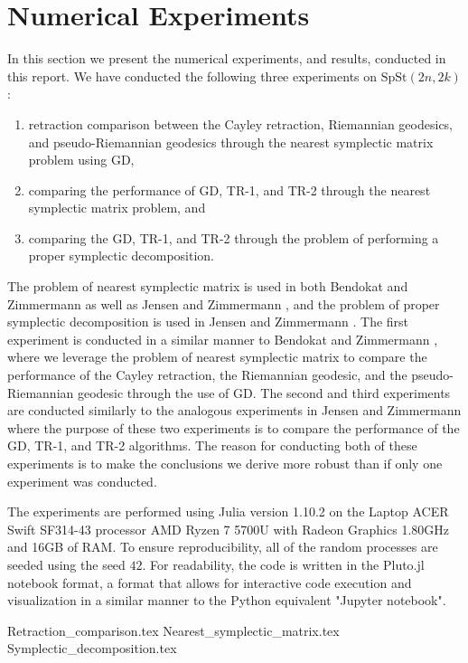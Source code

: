 \section{Numerical Experiments}\label{sec:Numerical_experiments}
In this section we present the numerical experiments, and results, conducted in this report. We have conducted the following three experiments on $\mathrm{SpSt}(2n, 2k)$: 
\begin{enumerate}
    \item retraction comparison between the Cayley retraction, Riemannian geodesics, and pseudo-Riemannian geodesics through the nearest symplectic matrix problem using GD, 
    \item comparing the performance of GD, TR-1, and TR-2 through the nearest symplectic matrix problem, and 
    \item comparing the GD, TR-1, and TR-2 through the problem of performing a proper symplectic decomposition.
\end{enumerate}
The problem of nearest symplectic matrix is used in both Bendokat and Zimmermann \cite[p.~25]{BendokatZimmermann2021} as well as Jensen and Zimmermann \cite[p.~15]{JensenZimmermann2024}, and the problem of proper symplectic decomposition is used in Jensen and Zimmermann \cite[p.~17]{JensenZimmermann2024}. The first experiment is conducted in a similar manner to Bendokat and Zimmermann \cite[p.~25]{BendokatZimmermann2021}, where we leverage the problem of nearest symplectic matrix to compare the performance of the Cayley retraction, the Riemannian geodesic, and the pseudo-Riemannian geodesic through the use of GD. The second and third experiments are conducted similarly to the analogous experiments in Jensen and Zimmermann \cite[p.~15~\&~17]{JensenZimmermann2024} where the purpose of these two experiments is to compare the performance of the GD, TR-1, and TR-2 algorithms. The reason for conducting both of these experiments is to make the conclusions we derive more robust than if only one experiment was conducted. 

The experiments are performed using Julia version 1.10.2 on the Laptop ACER Swift SF314-43 processor AMD Ryzen 7 5700U with Radeon Graphics 1.80GHz and 16GB of RAM. To ensure reproducibility, all of the random processes are seeded using the seed $42$. For readability, the code is written in the Pluto.jl notebook format, a format that allows for interactive code execution and visualization in a similar manner to the Python equivalent "Jupyter notebook". 

{Retraction_comparison.tex}
{Nearest_symplectic_matrix.tex}
{Symplectic_decomposition.tex}
